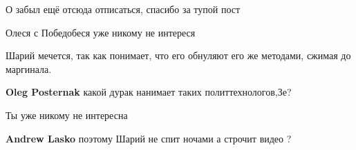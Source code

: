 \begin{itemize}
 
О забыл ещё отсюда отписаться, спасибо за тупой пост

 
Олеся с Победобеся уже никому не интереся🤮🤮🤮

 
Шарий мечется, так как понимает, что его обнуляют его же методами, сжимая до маргинала.

\begin{itemize}
 
\textbf{Oleg Posternak} какой дурак нанимает таких политтехнологов,Зе?
\end{itemize}

 
Ты уже никому не интересна

\begin{itemize}
 
\textbf{Andrew Lasko} поэтому Шарий не спит ночами а строчит видео ?

 

\end{itemize}
\end{itemize}
